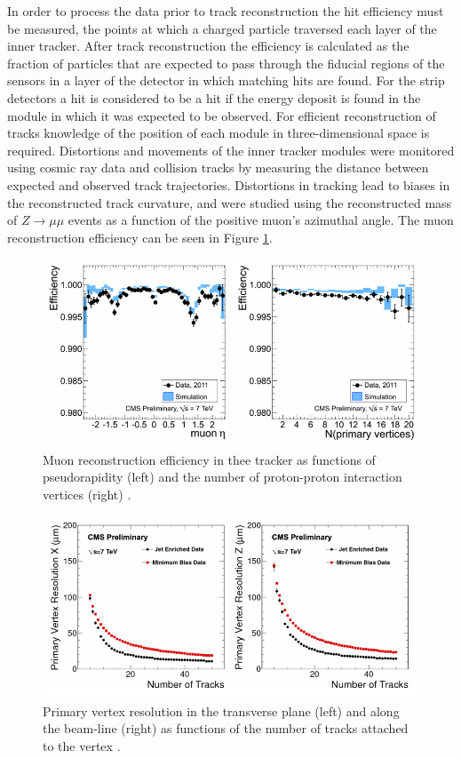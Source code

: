 In order to process the data prior to track reconstruction the hit efficiency must be measured, the points at which a charged particle traversed each layer of the inner tracker. After track reconstruction the efficiency is calculated as the fraction of particles that are expected to pass through the fiducial regions of the sensors in a layer of the detector in which matching hits are found. For the strip detectors a hit is considered to be a hit if the energy deposit is found in the module in which it was expected to be observed. For efficient reconstruction of tracks knowledge of the position of each module in three-dimensional space is required. Distortions and movements of the inner tracker modules were monitored using cosmic ray data and collision tracks by measuring the distance between expected and observed track trajectories. Distortions in tracking lead to biases in the reconstructed track curvature, and were studied using the reconstructed mass of $Z \to \mu\mu$ events as a function of the positive muon's azimuthal angle. The muon reconstruction efficiency can be seen in Figure \ref{fig-MuonReconstructionEfficiency}.

\begin{figure} 
\includegraphics[width=\textwidth]{Figures/MuonReconstructionEfficiency.png}
\caption{Muon reconstruction efficiency in thee tracker as functions of pseudorapidity (left) and the number
of proton-proton interaction vertices (right) \cite{TrackingResults}.}
\label{fig-MuonReconstructionEfficiency}
\end{figure}

\begin{figure} 
\includegraphics[width=\textwidth]{Figures/PVResolution.png}
\caption{Primary vertex resolution in the transverse plane (left) and along the beam-line (right) as functions
of the number of tracks attached to the vertex \cite{TrackingResults}.}
\label{fig-PVResolution}
\end{figure}

